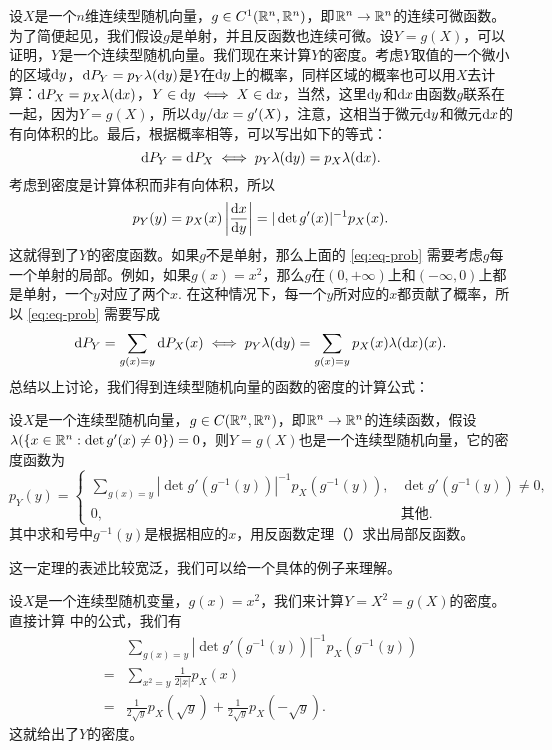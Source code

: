设$X$是一个$n$维连续型随机向量，$g\in C^1(\mathbb{R}^n,\mathbb{R}^n)$，即$\mathbb{R}^n\to\mathbb{R}^n$的连续可微函数。为了简便起见，我们假设$g$是单射，并且反函数也连续可微。设$Y=g(X)$，可以证明，$Y$是一个连续型随机向量。我们现在来计算$Y$的密度。考虑$Y$取值的一个微小的区域$\mathrm{d} y$，$\mathrm{d} P_Y=p_Y\lambda(\mathrm{d} y)$是$Y$在$\mathrm{d} y$上的概率，同样区域的概率也可以用$X$去计算：$\mathrm{d} P_X=p_X\lambda(\mathrm{d} x)$，$Y\in\mathrm{d} y\iff X\in\mathrm{d} x$，当然，这里$\mathrm{d} y$和$\mathrm{d} x$由函数$g$联系在一起，因为$Y=g(X)$，所以$\mathrm{d} y/\mathrm{d} x=g'(X)$，注意，这相当于微元$\mathrm{d} y$和微元$\mathrm{d} x$的有向体积的比。最后，根据概率相等，可以写出如下的等式：
\begin{equation}
    \mathrm{d} P_Y=\mathrm{d} P_X\iff p_Y\lambda(\mathrm{d} y)=p_X\lambda(\mathrm{d} x).\label{eq:eq-prob}
\end{equation}
考虑到密度是计算体积而非有向体积，所以
\[p_Y(y)=p_X(x)\left|\frac{\mathrm{d} x}{\mathrm{d} y}\right|=|\det g'(x)|^{-1}p_X(x).\]
这就得到了$Y$的密度函数。如果$g$不是单射，那么上面的 \eqref{eq:eq-prob} 需要考虑$g$每一个单射的局部。例如，如果$g(x)=x^2$，那么$g$在$(0,+\infty)$上和$(-\infty,0)$上都是单射，一个$y$对应了两个$x$. 在这种情况下，每一个$y$所对应的$x$都贡献了概率，所以 \eqref{eq:eq-prob} 需要写成
\begin{equation}
    \mathrm{d} P_Y=\sum_{g(x)=y}\mathrm{d} P_X(x)\iff p_Y\lambda(\mathrm{d} y)=\sum_{g(x)=y}p_X(x)\lambda(\mathrm{d} x)(x).\label{eq:eq-prob-2}
\end{equation}
总结以上讨论，我们得到连续型随机向量的函数的密度的计算公式：

\begin{proposition}\label{prop:continuous-function}
设$X$是一个连续型随机向量，$g\in C(\mathbb{R}^n,\mathbb{R}^n)$，即$\mathbb{R}^n\to\mathbb{R}^n$的连续函数，假设$\lambda(\{x\in\mathbb{R}^n:\det g'(x)\neq 0\})=0$，则$Y=g(X)$也是一个连续型随机向量，它的密度函数为
\[p_Y(y)=\begin{cases}
    \sum_{g(x)=y}|\det g'(g^{-1}(y))|^{-1}p_X(g^{-1}(y)),&\det g'(g^{-1}(y))\neq 0,\\
    0,&\text{其他}.
\end{cases}\]
其中求和号中$g^{-1}(y)$是根据相应的$x$，用反函数定理（）求出局部反函数。
\end{proposition}
这一定理的表述比较宽泛，我们可以给一个具体的例子来理解。

\begin{example}
设$X$是一个连续型随机变量，$g(x)=x^2$，我们来计算$Y=X^2=g(X)$的密度。直接计算 中的公式，我们有
\begin{align*}
    &\sum_{g(x)=y}|\det g'(g^{-1}(y))|^{-1}p_X(g^{-1}(y))\\
    =&\sum_{x^2=y}\frac{1}{2|x|}p_X(x)\\
    =&\frac{1}{2\sqrt{y}}p_X(\sqrt{y})+\frac{1}{2\sqrt{y}}p_X(-\sqrt{y}).
\end{align*}
这就给出了$Y$的密度。
\end{example}

